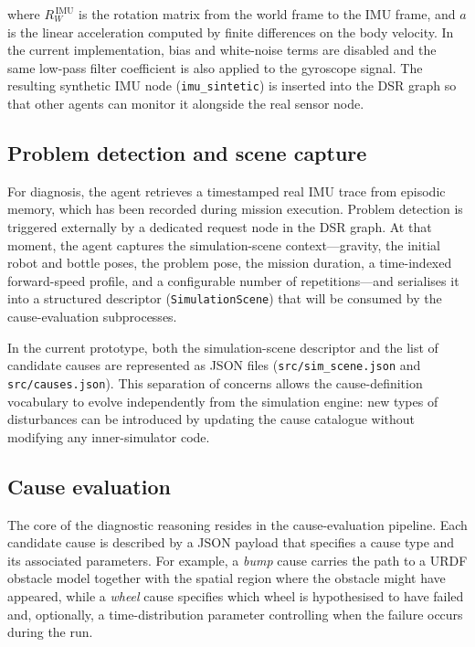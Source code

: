 \documentclass[a4paper, twoside]{article}
\begin{document}
\noindent where $R_{W}^{\,\mathrm{IMU}}$ is the rotation matrix from the world frame to the IMU frame, and $a$ is the linear acceleration computed by finite differences on the body velocity. In the current implementation, bias and white-noise terms are disabled and the same low-pass filter coefficient is also applied to the gyroscope signal.
The resulting synthetic IMU node (\texttt{imu\_sintetic}) is inserted into the DSR graph so that other agents can monitor it alongside the real sensor node.

\subsection{Problem detection and scene capture}

For diagnosis, the agent retrieves a timestamped real IMU trace from episodic memory, which has been recorded during mission execution.
Problem detection is triggered externally by a dedicated request node in the DSR graph.
At that moment, the agent captures the simulation-scene context---gravity, the initial robot and bottle poses, the problem pose, the mission duration, a time-indexed forward-speed profile, and a configurable number of repetitions---and serialises it into a structured descriptor (\texttt{SimulationScene}) that will be consumed by the cause-evaluation subprocesses.

In the current prototype, both the simulation-scene descriptor and the list of candidate causes are represented as JSON files (\texttt{src/sim\_scene.json} and \texttt{src/causes.json}).
This separation of concerns allows the cause-definition vocabulary to evolve independently from the simulation engine: new types of disturbances can be introduced by updating the cause catalogue without modifying any inner-simulator code.

\subsection{Cause evaluation}

The core of the diagnostic reasoning resides in the cause-evaluation pipeline.
Each candidate cause is described by a JSON payload that specifies a cause type and its associated parameters.
For example, a \emph{bump} cause carries the path to a URDF obstacle model together with the spatial region where the obstacle might have appeared, while a \emph{wheel} cause specifies which wheel is hypothesised to have failed and, optionally, a time-distribution parameter controlling when the failure occurs during the run.
\end{document}
